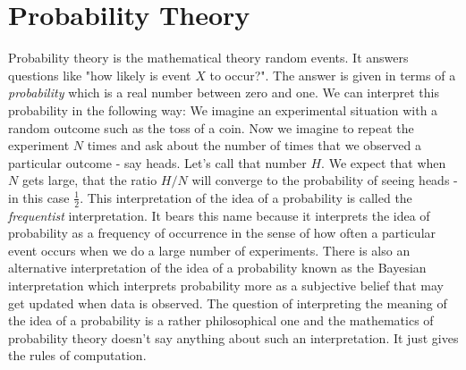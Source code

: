\section{Probability Theory}
Probability theory is the mathematical theory random events. It answers questions like "how likely is event $X$ to occur?". The answer is given in terms of a \emph{probability} which is a real number between zero and one. We can interpret this probability in the following way: We imagine an experimental situation with a random outcome such as the toss of a coin. Now we imagine to repeat the experiment $N$ times and ask about the number of times that we observed a particular outcome - say heads. Let's call that number $H$. We expect that when $N$ gets large, that the ratio $H/N$ will converge to the probability of seeing heads - in this case $\frac{1}{2}$. This interpretation of the idea of a probability is called the \emph{frequentist} interpretation. It bears this name because it interprets the idea of probability as a frequency of occurrence in the sense of how often a particular event occurs when we do a large number of experiments. There is also an alternative interpretation of the idea of a probability known as the Bayesian interpretation which interprets probability more as a subjective belief that may get updated when data is observed. The question of interpreting the meaning of the idea of a probability is a rather philosophical one and the mathematics of probability theory doesn't say anything about such an interpretation. It just gives the rules of computation.  




